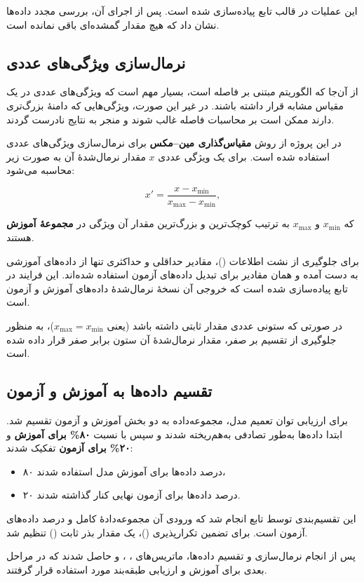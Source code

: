 این عملیات در قالب تابع  پیاده‌سازی شده است. پس از اجرای آن،
بررسی مجدد داده‌ها نشان داد که هیچ مقدار گمشده‌ای باقی نمانده است.

\subsection{نرمال‌سازی ویژگی‌های عددی}

از آن‌جا که الگوریتم  مبتنی بر فاصله است، بسیار مهم است که ویژگی‌های عددی در یک مقیاس
مشابه قرار داشته باشند. در غیر این صورت، ویژگی‌هایی که دامنهٔ بزرگ‌تری دارند ممکن است بر
محاسبات فاصله غالب شوند و منجر به نتایج نادرست گردند.

در این پروژه از روش \textbf{مقیاس‌گذاری مین–مکس} برای نرمال‌سازی ویژگی‌های عددی استفاده شده است.
برای یک ویژگی عددی $x$ مقدار نرمال‌شدهٔ آن به صورت زیر محاسبه می‌شود:

\begin{equation}
	x' = \frac{x - x_{\min}}{x_{\max} - x_{\min}},
\end{equation}

که $x_{\min}$ و $x_{\max}$ به ترتیب کوچک‌ترین و بزرگ‌ترین مقدار آن ویژگی در \textbf{مجموعهٔ آموزش}
هستند.

برای جلوگیری از نشت اطلاعات ()، مقادیر حداقلی و حداکثری تنها از داده‌های
آموزشی به دست آمده و همان مقادیر برای تبدیل داده‌های آزمون استفاده شده‌اند. این فرایند در تابع
 پیاده‌سازی شده است که خروجی آن نسخهٔ نرمال‌شدهٔ داده‌های آموزش و
آزمون است.

در صورتی که ستونی عددی مقدار ثابتی داشته باشد (یعنی $x_{\max} = x_{\min}$)، به منظور جلوگیری از تقسیم
بر صفر، مقدار نرمال‌شدهٔ آن ستون برابر صفر قرار داده شده است.

\subsection{تقسیم داده‌ها به آموزش و آزمون}

برای ارزیابی توان تعمیم مدل، مجموعه‌داده به دو بخش آموزش و آزمون تقسیم شد. ابتدا داده‌ها به‌طور
تصادفی به‌هم‌ریخته شدند و سپس با نسبت \textbf{۸۰\% برای آموزش} و \textbf{۲۰\% برای آزمون} تفکیک شدند:

\begin{itemize}
	\item ۸۰ درصد داده‌ها برای آموزش مدل استفاده شدند،
	\item ۲۰ درصد داده‌ها برای آزمون نهایی کنار گذاشته شدند.
\end{itemize}

این تقسیم‌بندی توسط تابع  انجام شد که ورودی آن مجموعه‌دادهٔ کامل
و درصد داده‌های آزمون است. برای تضمین تکرارپذیری ()، یک مقدار بذر ثابت
() تنظیم شد.

پس از انجام نرمال‌سازی و تقسیم داده‌ها، ماتریس‌های ، ،
 و  حاصل شدند که در مراحل بعدی برای آموزش و ارزیابی طبقه‌بند 
مورد استفاده قرار گرفتند.